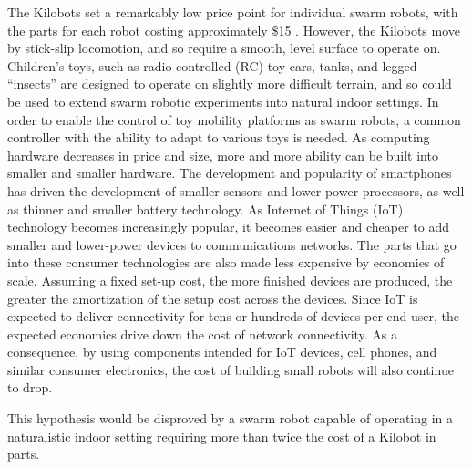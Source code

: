 The Kilobots set a remarkably low price point for individual swarm robots, with the parts for each robot costing approximately \$15 \citep{rubenstein2014kilobot}. 
However, the Kilobots move by stick-slip locomotion, and so require a smooth, level surface to operate on. 
Children's toys, such as radio controlled (RC) toy cars, tanks, and legged ``insects'' are designed to operate on slightly more difficult terrain, and so could be used to extend swarm robotic experiments into natural indoor settings. 
In order to enable the control of toy mobility platforms as swarm robots, a common controller with the ability to adapt to various toys is needed.   
As computing hardware decreases in price and size, more and more ability can be built into smaller and smaller hardware. 
The development and popularity of smartphones has driven the development of smaller sensors and lower power processors, as well as thinner and smaller battery technology. 
As Internet of Things (IoT) technology becomes increasingly popular, it becomes easier and cheaper to add smaller and lower-power devices to communications networks. 
The parts that go into these consumer technologies are also made less expensive by economies of scale. 
Assuming a fixed set-up cost, the more finished devices are produced, the greater the amortization of the setup cost across the devices. 
Since IoT is expected to deliver connectivity for tens or hundreds of devices per end user, the expected economics drive down the cost of network connectivity.
As a consequence, by using components intended for IoT devices, cell phones, and similar consumer electronics, the cost of building small robots will also continue to drop.

This hypothesis would be disproved by a swarm robot capable of operating in a naturalistic indoor setting requiring more than twice the cost of a Kilobot in parts. 

